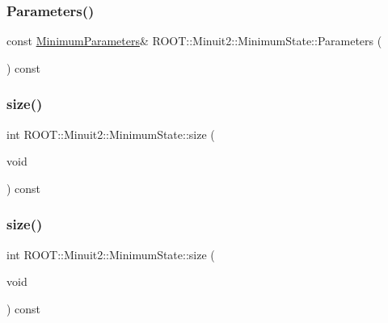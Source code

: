 \subsubsection{\texorpdfstring{Parameters()}{Parameters()}\hspace{0.1cm}{\footnotesize\ttfamily [3/3]}}
{\footnotesize\ttfamily const \mbox{\hyperlink{classROOT_1_1Minuit2_1_1MinimumParameters}{Minimum\+Parameters}}\& R\+O\+O\+T\+::\+Minuit2\+::\+Minimum\+State\+::\+Parameters (\begin{DoxyParamCaption}{ }\end{DoxyParamCaption}) const\hspace{0.3cm}{\ttfamily [inline]}}

\mbox{\label{classROOT_1_1Minuit2_1_1MinimumState_af680928a4485a4d0db0c81a8283d24bd}} 
\subsubsection{\texorpdfstring{size()}{size()}\hspace{0.1cm}{\footnotesize\ttfamily [1/3]}}
{\footnotesize\ttfamily int R\+O\+O\+T\+::\+Minuit2\+::\+Minimum\+State\+::size (\begin{DoxyParamCaption}\item[{void}]{ }\end{DoxyParamCaption}) const\hspace{0.3cm}{\ttfamily [inline]}}

\mbox{\label{classROOT_1_1Minuit2_1_1MinimumState_af680928a4485a4d0db0c81a8283d24bd}} 
\subsubsection{\texorpdfstring{size()}{size()}\hspace{0.1cm}{\footnotesize\ttfamily [2/3]}}
{\footnotesize\ttfamily int R\+O\+O\+T\+::\+Minuit2\+::\+Minimum\+State\+::size (\begin{DoxyParamCaption}\item[{void}]{ }\end{DoxyParamCaption}) const\hspace{0.3cm}{\ttfamily [inline]}}

